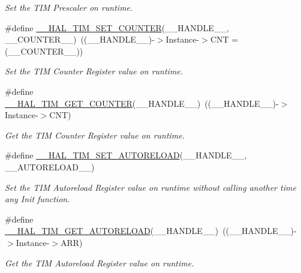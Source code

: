 \begin{DoxyCompactItemize}
\begin{DoxyCompactList}\small\item\em Set the T\+IM Prescaler on runtime. \end{DoxyCompactList}\item 
\#define \mbox{\hyperlink{group___t_i_m___exported___macros_ga9746ac75e4cd25cec1a9ebac8cb82b97}{\+\_\+\+\_\+\+H\+A\+L\+\_\+\+T\+I\+M\+\_\+\+S\+E\+T\+\_\+\+C\+O\+U\+N\+T\+ER}}(\+\_\+\+\_\+\+H\+A\+N\+D\+L\+E\+\_\+\+\_\+,  \+\_\+\+\_\+\+C\+O\+U\+N\+T\+E\+R\+\_\+\+\_\+)~((\+\_\+\+\_\+\+H\+A\+N\+D\+L\+E\+\_\+\+\_\+)-\/$>$Instance-\/$>$C\+NT = (\+\_\+\+\_\+\+C\+O\+U\+N\+T\+E\+R\+\_\+\+\_\+))
\begin{DoxyCompactList}\small\item\em Set the T\+IM Counter Register value on runtime. \end{DoxyCompactList}\item 
\#define \mbox{\hyperlink{group___t_i_m___exported___macros_gaf1af08014b9d06efbbb091d58d47c8ba}{\+\_\+\+\_\+\+H\+A\+L\+\_\+\+T\+I\+M\+\_\+\+G\+E\+T\+\_\+\+C\+O\+U\+N\+T\+ER}}(\+\_\+\+\_\+\+H\+A\+N\+D\+L\+E\+\_\+\+\_\+)~((\+\_\+\+\_\+\+H\+A\+N\+D\+L\+E\+\_\+\+\_\+)-\/$>$Instance-\/$>$C\+NT)
\begin{DoxyCompactList}\small\item\em Get the T\+IM Counter Register value on runtime. \end{DoxyCompactList}\item 
\#define \mbox{\hyperlink{group___t_i_m___exported___macros_ga1e6300cab1e34ecaaf490dc7d4812d69}{\+\_\+\+\_\+\+H\+A\+L\+\_\+\+T\+I\+M\+\_\+\+S\+E\+T\+\_\+\+A\+U\+T\+O\+R\+E\+L\+O\+AD}}(\+\_\+\+\_\+\+H\+A\+N\+D\+L\+E\+\_\+\+\_\+,  \+\_\+\+\_\+\+A\+U\+T\+O\+R\+E\+L\+O\+A\+D\+\_\+\+\_\+)
\begin{DoxyCompactList}\small\item\em Set the T\+IM Autoreload Register value on runtime without calling another time any Init function. \end{DoxyCompactList}\item 
\#define \mbox{\hyperlink{group___t_i_m___exported___macros_gaa7a5c7645695bad15bacd402513a028a}{\+\_\+\+\_\+\+H\+A\+L\+\_\+\+T\+I\+M\+\_\+\+G\+E\+T\+\_\+\+A\+U\+T\+O\+R\+E\+L\+O\+AD}}(\+\_\+\+\_\+\+H\+A\+N\+D\+L\+E\+\_\+\+\_\+)~((\+\_\+\+\_\+\+H\+A\+N\+D\+L\+E\+\_\+\+\_\+)-\/$>$Instance-\/$>$A\+RR)
\begin{DoxyCompactList}\small\item\em Get the T\+IM Autoreload Register value on runtime. \end{DoxyCompactList}\item 

\end{DoxyCompactItemize}
